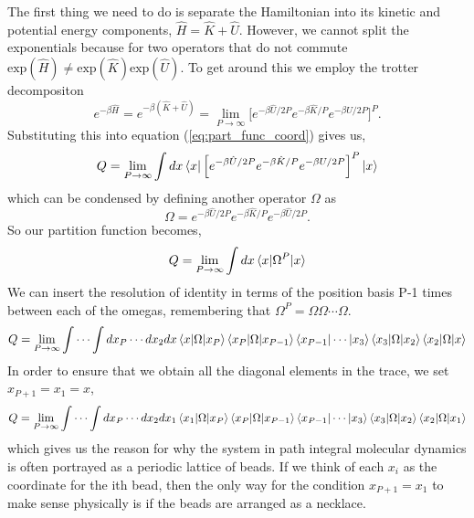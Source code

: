 \documentclass{article}
\newcommand{\be}{\begin{equation}}
\newcommand{\ee}{\end{equation}}
\begin{document}
The first thing we need to do is separate the Hamiltonian into its kinetic and potential energy components, $\hat{H} = \hat{K} + \hat{U}$.
However, we cannot split the exponentials because for two operators that do not commute $\text{exp}(\hat{H}) \neq \text{exp}(\hat{K}) \text{exp}(\hat{U})$.
To get around this we employ the trotter decompositon
\be
  e^{- \beta \hat{H}} = e^{- \beta (\hat{K} + \hat{U})} = \lim_{P \to\infty} \Big[ e^{- \beta \hat{U}/2P} e^{-\beta \hat{K}/P} e^{-\beta{U}/2P} \Big]^P .
\ee
Substituting this into equation (\ref{eq:part_func_coord}) gives us,
\be
  Q = \lim_{P \to\infty} \int dx \bra{x} \Big[ e^{- \beta \hat{U}/2P} e^{-\beta \hat{K}/P} e^{-\beta{U}/2P} \Big]^P \ket{x}
\ee
which can be condensed by defining another operator $\Omega$ as
\be
  \Omega = e^{-\beta \hat{U}/2P} e^{-\beta \hat{K}/P} e^{-\beta \hat{U}/2P} .
\ee
So our partition function becomes,
\be
  Q = \lim_{P \to\infty} \int dx \braket{x|\Omega^P|x}
\ee
We can insert the resolution of identity in terms of the position basis P-1 times between each of the omegas, remembering that $\Omega^P = \Omega \Omega \cdots \Omega$.
\be
  Q = \lim_{P \to\infty} \int \cdots \int dx_P \cdots dx_2 dx \braket{x|\Omega|x_P} \braket{x_P|\Omega|x_{P-1}} \bra{x_{P-1}} \cdots \ket{x_3} \braket{x_3|\Omega|x_2} \braket{x_2|\Omega|x}
\ee
In order to ensure that we obtain all the diagonal elements in the trace, we set $x_{P+1} = x_1 = x$,
\be \label{eq:part_func_path_int}
  Q = \lim_{P \to\infty} \int \cdots \int dx_P \cdots dx_2 dx_1 \braket{x_1|\Omega|x_P} \braket{x_P|\Omega|x_{P-1}} \bra{x_{P-1}} \cdots \ket{x_3} \braket{x_3|\Omega|x_2} \braket{x_2|\Omega|x_1}
\ee
which gives us the reason for why the system in path integral molecular dynamics is often portrayed as a periodic lattice of beads.
If we think of each $x_i$ as the coordinate for the ith bead, then the only way for the condition $x_{P+1} = x_1$ to make sense physically is if the beads are arranged as a necklace.
\end{document}

